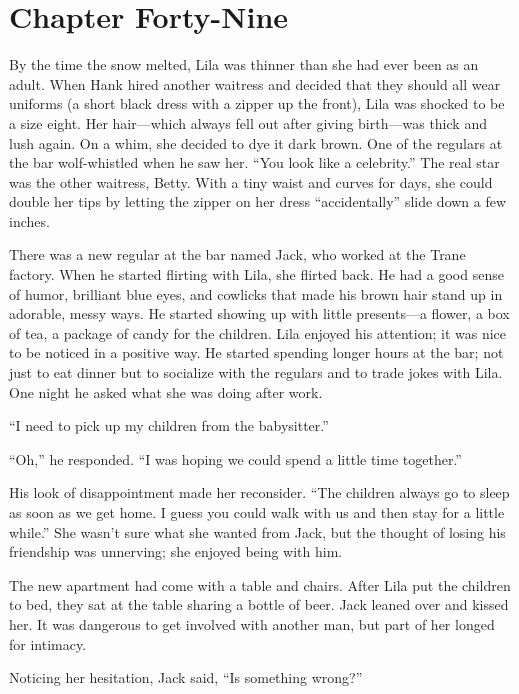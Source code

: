 \documentclass[
  american,
  letterpaper,
]{book}
\begin{document}

\chapter{Chapter Forty-Nine}\label{chapter-forty-nine}

By the time the snow melted, Lila was thinner than she had ever been as
an adult. When Hank hired another waitress and decided that they should
all wear uniforms (a short black dress with a zipper up the front), Lila
was shocked to be a size eight. Her hair---which always fell out after
giving birth---was thick and lush again. On a whim, she decided to dye
it dark brown. One of the regulars at the bar wolf-whistled when he saw
her. ``You look like a celebrity.'' The real star was the other
waitress, Betty. With a tiny waist and curves for days, she could double
her tips by letting the zipper on her dress ``accidentally'' slide down
a few inches.

There was a new regular at the bar named Jack, who worked at the Trane
factory. When he started flirting with Lila, she flirted back. He had a
good sense of humor, brilliant blue eyes, and cowlicks that made his
brown hair stand up in adorable, messy ways. He started showing up with
little presents---a flower, a box of tea, a package of candy for the
children. Lila enjoyed his attention; it was nice to be noticed in a
positive way. He started spending longer hours at the bar; not just to
eat dinner but to socialize with the regulars and to trade jokes with
Lila. One night he asked what she was doing after work.

``I need to pick up my children from the babysitter.''

``Oh,'' he responded. ``I was hoping we could spend a little time
together.''

His look of disappointment made her reconsider. ``The children always go
to sleep as soon as we get home. I guess you could walk with us and then
stay for a little while.'' She wasn't sure what she wanted from Jack,
but the thought of losing his friendship was unnerving; she enjoyed
being with him.

The new apartment had come with a table and chairs. After Lila put the
children to bed, they sat at the table sharing a bottle of beer. Jack
leaned over and kissed her. It was dangerous to get involved with
another man, but part of her longed for intimacy.

Noticing her hesitation, Jack said, ``Is something wrong?''
\end{document}
